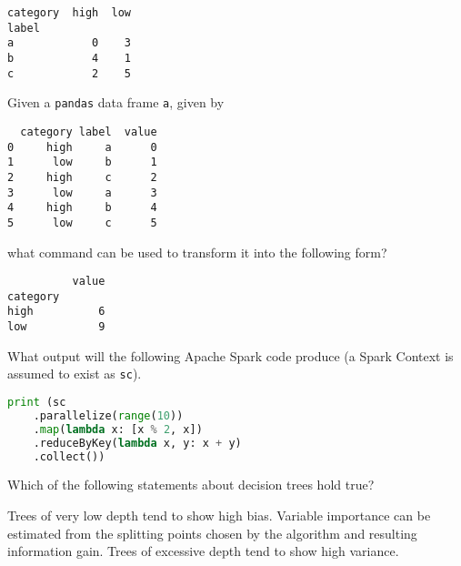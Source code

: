 \documentclass[a4paper,11pt,english,plainsub]{uioexam}
\newcommand{\ttc}[1]{\choice {\tt #1}}
\begin{document}
\begin{verbatim}
category  high  low
label
a            0    3
b            4    1
c            2    5
\end{verbatim}

\begin{choicelist}
\end{choicelist}


Given a {\tt pandas} data frame {\tt a}, given by

\begin{verbatim}
  category label  value
0     high     a      0
1      low     b      1
2     high     c      2
3      low     a      3
4     high     b      4
5      low     c      5
\end{verbatim}

what command can be used to transform it into the following form?

\begin{verbatim}
          value
category
high          6
low           9
\end{verbatim}

\begin{choicelist}
\end{choicelist}


What output will the following Apache Spark code produce (a Spark
Context is assumed to exist as {\tt sc}).

\begin{lstlisting}[language=Python]
  print (sc
    .parallelize(range(10))
    .map(lambda x: [x % 2, x])
    .reduceByKey(lambda x, y: x + y)
    .collect())
\end{lstlisting}

\begin{choicelist}
  \ttc{[(0, 20), (1, 20)]}
  \ttc{[(0, 20), (1, 25)]}
  \ttc{[(0, 10), (1, 15), (3, 10)]}
\end{choicelist}



Which of the following statements about decision trees hold true?

\begin{choicelist}
  \choice Trees of very low depth tend to show high bias.
  \choice Variable importance can be estimated from the  splitting
  points chosen by the algorithm and resulting information gain.
  \choice Trees of excessive depth tend to show high variance.
\end{choicelist}
\end{document}
